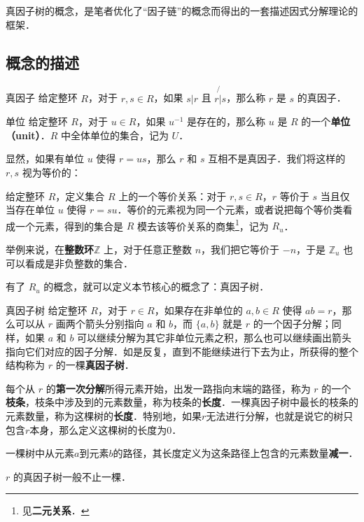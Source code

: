 

真因子树的概念，是笔者优化了“因子链”的概念而得出的一套描述因式分解理论的框架．

\subsection{概念的描述}

\begin{definition}{真因子}
给定整环 $R$，对于 $r, s\in R$，如果 $s|r$ 且 $r\not{|}s$，那么称 $r$ 是 $s$ 的真因子．
\end{definition}

\begin{definition}{单位}
给定整环 $R$，对于 $u\in R$，如果 $u^{-1}$ 是存在的，那么称 $u$ 是 $R$ 的一个\textbf{单位（unit）}．$R$ 中全体单位的集合，记为 $U$．
\end{definition}

显然，如果有单位 $u$ 使得 $r=us$，那么 $r$ 和 $s$ 互相不是真因子．我们将这样的 $r, s$ 视为等价的：

\begin{definition}{}
给定整环 $R$，定义集合 $R$ 上的一个等价关系：对于 $r, s\in R$，$r$ 等价于 $s$ 当且仅当存在单位 $u$ 使得 $r=su$．等价的元素视为同一个元素，或者说把每个等价类看成一个元素，得到的集合是 $R$ 模去该等价关系的商集\footnote{见\textbf{二元关系}．}，记为 $R_u$．
\end{definition}

举例来说，在\textbf{整数环}$\mathbb{Z}$ 上，对于任意正整数 $n$，我们把它等价于 $-n$，于是 $\mathbb{Z}_u$ 也可以看成是非负整数的集合．

有了 $R_u$ 的概念，就可以定义本节核心的概念了：真因子树．

\begin{definition}{真因子树}
给定整环 $R$，对于 $r\in R$，如果存在非单位的 $a, b\in R$ 使得 $ab=r$，那么可以从 $r$ 画两个箭头分别指向 $a$ 和 $b$，而 $\{a, b\}$ 就是 $r$ 的一个因子分解；同样，如果 $a$ 和 $b$ 可以继续分解为其它非单位元素之积，那么也可以继续画出箭头指向它们对应的因子分解．如是反复，直到不能继续进行下去为止，所获得的整个结构称为 $r$ 的一棵\textbf{真因子树}．

每个从 $r$ 的\textbf{第一次分解}所得元素开始，出发一路指向末端的路径，称为 $r$ 的一个\textbf{枝条}，枝条中涉及到的元素数量，称为枝条的\textbf{长度}．一棵真因子树中最长的枝条的元素数量，称为这棵树的\textbf{长度}．特别地，如果$r$无法进行分解，也就是说它的树只包含$r$本身，那么定义这棵树的长度为$0$．

一棵树中从元素$a$到元素$b$的路径，其长度定义为这条路径上包含的元素数量\textbf{减一}．

$r$ 的真因子树一般不止一棵．
\end{definition}

